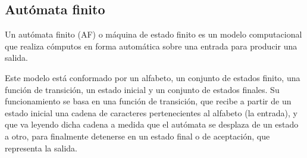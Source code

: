 \subsection{Autómata finito}

Un autómata finito (AF) o máquina de estado finito es un modelo computacional que realiza cómputos en forma automática sobre una entrada para producir una salida.

Este modelo está conformado por un alfabeto, un conjunto de estados finito, una función de transición, un estado inicial y un conjunto de estados finales. Su funcionamiento se basa en una función de transición, que recibe a partir de un estado inicial una cadena de caracteres pertenecientes al alfabeto (la entrada), y que va leyendo dicha cadena a medida que el autómata se desplaza de un estado a otro, para finalmente detenerse en un estado final o de aceptación, que representa la salida. 